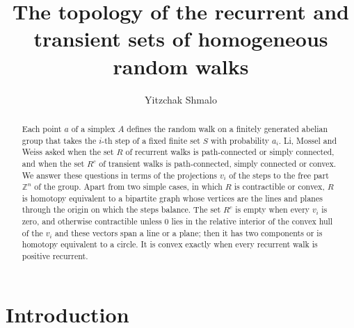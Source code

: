 \documentclass[11pt]{amsart}
\theoremstyle{remark}
\newcommand{\Z}{\mathbb{Z}}
\begin{document}
\title[Topology of the recurrent and transient sets]{The topology of the recurrent and transient sets of homogeneous
random walks}
\author{Yitzchak Shmalo}
\address{Einstein Institute of Mathematics, The Hebrew University of Jerusalem, Jerusalem, Israel}

\begin{abstract}
Each point $a$ of a simplex $A$ defines the random walk on a finitely generated abelian group that takes the $i$-th
step of a fixed finite set $S$ with probability $a_i$. Li, Mossel and Weiss asked when the set $R$ of recurrent walks
is path-connected or simply connected, and when the set $R^c$ of transient walks is path-connected, simply connected or
convex. We answer these questions in terms of the projections $v_i$ of the steps to the free part $\Z^n$ of the group.
Apart from two simple cases, in which $R$ is contractible or convex, $R$ is homotopy equivalent to a bipartite graph
whose vertices are the lines and planes through the origin on which the steps balance. The set $R^c$ is empty when
every $v_i$ is zero, and otherwise contractible unless $0$ lies in the relative interior of the convex hull of the $v_i$ and these vectors span a line or a plane; then
it has two components or is homotopy equivalent to a circle. It is convex exactly when every recurrent walk is
positive recurrent.
\end{abstract}

\maketitle

\section{Introduction}\label{sec:intro}
\end{document}
